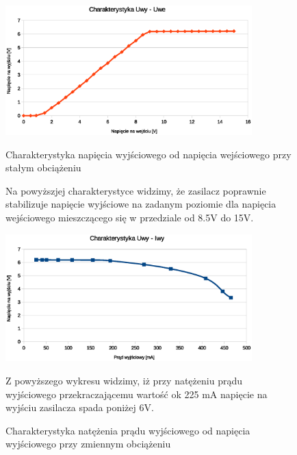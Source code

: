 \documentclass[a4paper,12pt]{article}
\begin{document}
\begin{figure}[h!]
  \begin{center}
  \includegraphics[width=0.85\textwidth]{Uwe_Uwy.eps}
  \caption{Charakterystyka napięcia wyjściowego od napięcia wejściowego przy stałym obciążeniu}
  \end{center}

Na powyższjej charakterystyce widzimy, że zasilacz poprawnie stabilizuje napięcie wyjściowe na zadanym poziomie
dla napięcia wejściowego mieszczącego się w przedziale od 8.5V do 15V.

  \begin{center}
  \includegraphics[width=0.85\textwidth]{Uwy_Iwy.eps}
  \caption{Charakterystyka natężenia prądu wyjściowego od napięcia wyjściowego przy zmiennym obciążeniu}
  \end{center}

Z powyższego wykresu widzimy, iż przy natężeniu prądu wyjściowego przekraczającemu wartość ok 225 mA 
napięcie na wyjściu zasilacza spada poniżej 6V.
\end{figure}

\pagebreak
\end{document}
